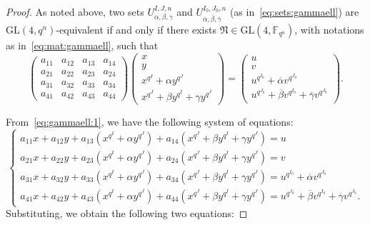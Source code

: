 \begin{proof}
As noted above, two sets $U_{\alpha, \beta, \gamma}^{I,J,n}$ and $U_{\overline{\alpha}, \overline{\beta}, \overline{\gamma}}^{I_0,J_0,n}$ (as in~\eqref{eq:sets:gammaell}) are $\textrm{GL}(4,q^n)$-equivalent if and only if there exists $\mathfrak{N} \in \mathrm{GL}(4,\mathbb{F}_{q^n})$, with notations as in~\eqref{eq:mat:gammaell},
such that 
\begin{equation}
\label{eq:gammaell:1}
\begin{pmatrix}
a_{11}&a_{12}&a_{13}&a_{14}\\
a_{21}&a_{22}&a_{23}&a_{24}\\
a_{31}&a_{32}&a_{33}&a_{34}\\
a_{41}&a_{42}&a_{43}&a_{44}
\end{pmatrix}
\begin{pmatrix}
x\\
y\\
x^{q^I}+\alpha y^{q^J}\\
x^{q^J}+\beta y^{q^I} + \gamma y^{q^J}
\end{pmatrix}=
\begin{pmatrix}
u\\
v\\
u^{q^{I_0}}+\overline{\alpha} v^{q^{J_0}}\\
u^{q^{J_0}}+\overline{\beta} v^{q^{I_0}} + \overline{\gamma} v^{q^{J_0}}
\end{pmatrix}.
\end{equation}

From~\eqref{eq:gammaell:1}, we have the following system of equations:
{\small \begin{equation*}
    \begin{cases}
a_{11}x + a_{12} y  + a_{13}\left(x^{q^I}+\alpha y ^{q^J}\right) + a_{14}\left(x^{q^J}+\beta y ^{q^I}+\gamma y ^{q^J}\right)=u\\
a_{21}x + a_{22} y  + a_{23}\left(x^{q^I}+\alpha y ^{q^J}\right) + a_{24}\left(x^{q^J}+\beta y ^{q^I}+\gamma y ^{q^J}\right)=v\\
a_{31}x + a_{32} y  + a_{33}\left(x^{q^I}+\alpha y ^{q^J}\right) + a_{34}\left(x^{q^J}+\beta y ^{q^I}+\gamma y ^{q^J}\right)=u^{q^{I_0}}+\overline{\alpha} v^{q^{J_0}}\\
a_{41}x + a_{42} y  + a_{43}\left(x^{q^I}+\alpha y ^{q^J}\right) + a_{44}\left(x^{q^J}+\beta y ^{q^I}+\gamma y ^{q^J}\right)=u^{q^{J_0}}+\overline{\beta} v^{q^{I_0}} + \overline{\gamma} v^{q^{J_0}}.
    \end{cases}
\end{equation*}}
Substituting, we obtain the following two equations:


\end{proof}
